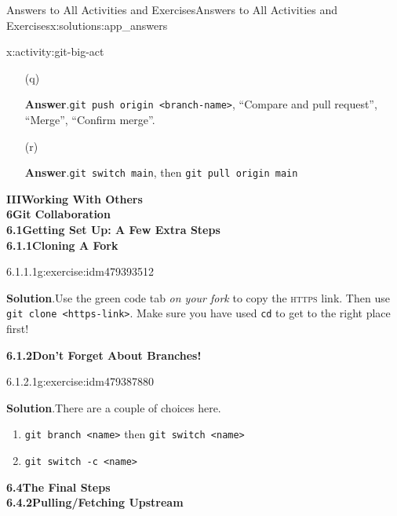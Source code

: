 \documentclass[oneside,10pt,]{book}
\newcommand{\blocktitlefont}{\relax}
\newcommand{\mono}[1]{\texttt{#1}}
\newcommand{\initialism}[1]{\textsc{\MakeLowercase{#1}}}
\begin{document}
\begin{solutions-chapter}{Answers to All Activities and Exercises}{}{Answers to All Activities and Exercises}{}{}{x:solutions:app_answers}
\begin{activitysolution}{4.11}{}{x:activity:git-big-act}
\begin{enumerate}[font=\bfseries,label=(\alph*),ref=\alph*]
\item[(q)]\par\smallskip%
\noindent\textbf{\blocktitlefont Answer}.\hypertarget{g:answer:idm479646808-back}{}\quad{}\mono{git push origin <branch-name>}, ``Compare and pull request'', ``Merge'', ``Confirm merge''.%
\item[(r)]\par\smallskip%
\noindent\textbf{\blocktitlefont Answer}.\hypertarget{g:answer:idm479642968-back}{}\quad{}\mono{git switch main}, then \mono{git pull origin main}%
\end{enumerate}
\end{activitysolution}%
\par\medskip
\noindent\textbf{\Large{}III\space\textperiodcentered\space{}Working With Others\\
6\space\textperiodcentered\space{}Git Collaboration\\
6.1\space\textperiodcentered\space{}Getting Set Up: A Few Extra Steps\\
6.1.1\space\textperiodcentered\space{}Cloning A Fork}
\begin{inlinesolution}{6.1.1.1}{}{g:exercise:idm479393512}%
\par\smallskip%
\noindent\textbf{\blocktitlefont Solution}.\hypertarget{g:solution:idm479391080-back}{}\quad{}Use the green code tab \emph{on your fork} to copy the \initialism{HTTPS} link. Then use \mono{git clone <https-link>}. Make sure you have used \mono{cd} to get to the right place first!%
\end{inlinesolution}%
\par\medskip
\noindent\textbf{\Large{}6.1.2\space\textperiodcentered\space{}Don't Forget About Branches!}
\begin{inlinesolution}{6.1.2.1}{}{g:exercise:idm479387880}%
\par\smallskip%
\noindent\textbf{\blocktitlefont Solution}.\hypertarget{g:solution:idm479382120-back}{}\quad{}There are a couple of choices here.%
\begin{enumerate}
\item{}\mono{git branch <name>} then \mono{git switch <name>}%
\item{}\mono{git switch -c <name>}%
\end{enumerate}
%
\end{inlinesolution}%
\par\medskip
\noindent\textbf{\Large{}6.4\space\textperiodcentered\space{}The Final Steps\\
6.4.2\space\textperiodcentered\space{}Pulling\slash{}Fetching Upstream}

\end{solutions-chapter}
\end{document}
